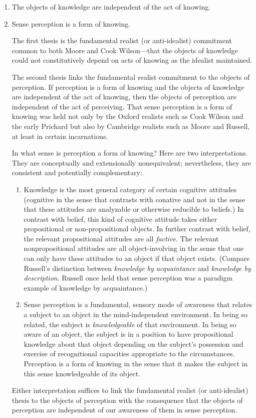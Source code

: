 \documentclass[11pt]{article}
\begin{document}
\begin{enumerate}
    \item The objects of knowledge are independent of the act of knowing.
    \item Sense perception is a form of knowing. 

The first thesis is the fundamental realist (or anti-idealist) commitment common to both Moore and Cook Wilson---that the objects of knowledge could not constitutively depend on acts of knowing as the idealist maintained.

The second thesis links the fundamental realist commitment to the objects of perception. If perception is a form of knowing and the objects of knowledge are independent of the act of knowing, then the objects of perception are independent of the act of perceiving. That sense perception is a form of knowing was held not only by the Oxford realists such as Cook Wilson and the early Prichard but also by Cambridge realists such as Moore and Russell, at least in certain incarnations. 

In what sense is perception a form of knowing? Here are two interpretations. They are conceptually and extensionally nonequivalent; nevertheless, they are consistent and potentially complementary:
\begin{enumerate}
    \item Knowledge is the most general category of certain cognitive attitudes (cognitive in the sense that contrasts with conative and not in the sense that these attitudes are analyzable or otherwise reducible to beliefs.) In contrast with belief, this kind of cognitive attitude takes either propositional or non-propositional objects. In further contrast with belief, the relevant propositional attitudes are all \emph{factive}. The relevant nonpropositional attitudes are all object-involving in the sense that one can only have these attitudes to an object if that object exists. (Compare Russell's distinction between \emph{knowledge by acquaintance} and \emph{knowledge by description}. Russell once held that sense perception was a paradigm example of knowledge by acquaintance.)
    \item Sense perception is a fundamental, sensory mode of awareness that relates a subject to an object in the mind-independent environment. In being so related, the subject is \emph{knowledgeable} of that environment. In being so aware of an object, the subject is in a position to have propositional knowledge about that object depending on the subject's possession and exercise of recognitional capacities appropriate to the circumstances. Perception is a form of knowing in the sense that it makes the subject in this sense knowledgeable of its object.
\end{enumerate}
Either interpretation suffices to link the fundamental realist (or anti-idealist) thesis to the objects of perception with the consequence that the objects of perception are independent of our awareness of them in sense perception. 


\end{enumerate}
\end{document}
